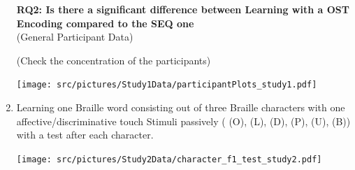 \begin{enumerate}
\textbf{RQ2: Is there a significant difference between Learning with a OST Encoding compared to the SEQ one}\\

(General Participant Data)


    
(Check the concentration of the participants)

    \centering
    \texttt{[image: src/pictures/Study1Data/participantPlots\_study1.pdf]}




    \item Learning one Braille word consisting out of three Braille characters with one affective/discriminative touch Stimuli passively ( (O), (L), (D),  (P),  (U), (B)) with a test after each character.

    \centering
    \texttt{[image: src/pictures/Study2Data/character\_f1\_test\_study2.pdf]}


\end{enumerate}
